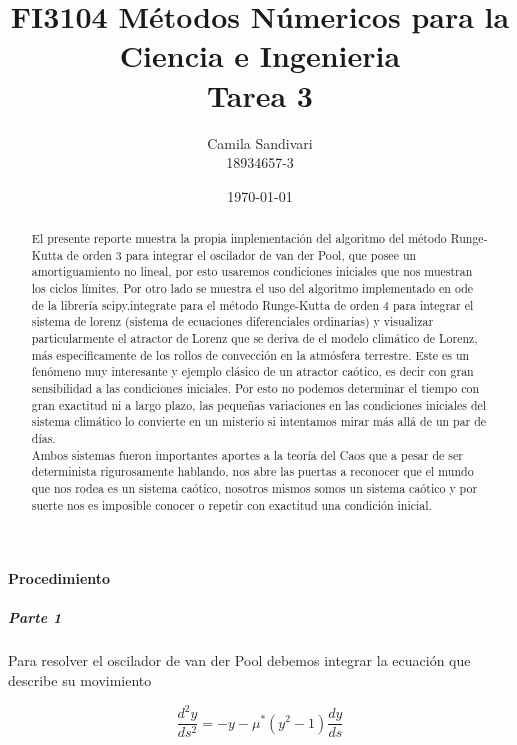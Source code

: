 \documentclass[prl,showpacs, twocolumn]{revtex4-1}
\begin{document}
\title{FI3104 M\'etodos N\'umericos para la Ciencia e Ingenieria\\ Tarea 3}
\author{Camila Sandivari\\18934657-3}
\date{\today}

\begin{abstract}
El presente reporte muestra la propia implementaci\'on del algoritmo del m\'etodo Runge-Kutta de orden $3$ para integrar el oscilador de van der Pool, que posee un amortiguamiento no lineal, por esto usaremos condiciones iniciales que nos muestran los ciclos l\'imites. Por otro lado se muestra el uso del algoritmo implementado en ode de la librer\'ia scipy.integrate para el m\'etodo Runge-Kutta de orden $4$ para integrar el sistema de lorenz (sistema de ecuaciones diferenciales ordinarias) y visualizar particularmente el atractor de Lorenz que se deriva de el modelo clim\'atico de Lorenz, m\'as especificamente de los rollos de convecci\'on en la atm\'osfera terrestre. Este es un fen\'omeno muy interesante y ejemplo cl\'asico de un atractor ca\'otico, es decir con gran sensibilidad a las condiciones iniciales. Por esto no podemos determinar el tiempo con gran exactitud ni a largo plazo, las peque\~nas variaciones en las condiciones iniciales del sistema clim\'atico lo convierte en un misterio si intentamos mirar m\'as all\'a de un par de d\'ias.\\Ambos sistemas fueron importantes aportes a la teor\'ia del Caos que a pesar de ser determinista rigurosamente hablando, nos abre las puertas a reconocer que el mundo que nos rodea es un sistema ca\'otico, nosotros mismos somos un sistema ca\'otico y por suerte nos es imposible conocer o repetir con exactitud una condici\'on inicial. 
\end{abstract}
\maketitle

\paragraph{Procedimiento}
\subparagraph{Parte 1}
Para resolver el oscilador de van der Pool debemos integrar la ecuaci\'on que describe su movimiento 

\begin{equation}
\frac{d^2y}{ds^2} = - y - \mu^* (y^2 - 1) \frac{dy}{ds}
\end{equation}
\end{document}
